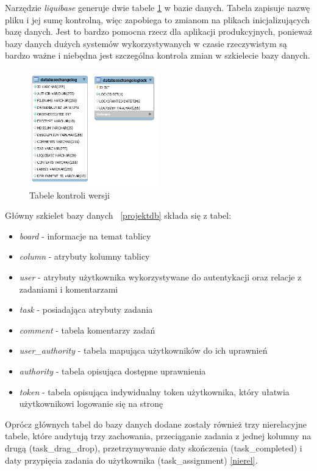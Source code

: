 Narzędzie \textit{liquibase} generuje dwie tabele \ref{liqutable} w bazie danych. Tabela zapisuje nazwę pliku i jej sumę kontrolną, więc zapobiega to zmianom na plikach inicjalizujących bazę danych.
Jest to bardzo pomocna rzecz dla aplikacji produkcyjnych, ponieważ bazy danych dużych systemów wykorzystywanych w czasie rzeczywistym są bardzo ważne i niebędna jest szczególna kontrola zmian w szkielecie bazy danych.
\clearpage
\begin{figure}[h]
	\centering
	\includegraphics[width=0.50\textwidth]{liquibasetables}
	\caption{ Tabele kontroli wersji}
	\label{liqutable}
\end{figure}

Główny szkielet bazy danych  ~\ref{projektdb}
składa się z tabel:
\begin{itemize}
	\item \textit{board} - informacje na temat tablicy
	\item \textit{column} - atrybuty kolumny tablicy
		\item \textit{user} - atrybuty użytkownika wykorzystywane do autentykacji oraz relacje z zadaniami i komentarzami
			\item \textit{task} - posiadająca atrybuty zadania
			\item \textit{comment} - tabela komentarzy zadań
				\item \textit{user\_authority} - tabela mapująca użytkowników do ich uprawnień
				\item \textit{authority} - tabela opisująca dostępne uprawnienia
				\item \textit{token} - tabela opisująca indywidualny token użytkownika, który ułatwia użytkownikowi logowanie się na stronę
\end{itemize}

Oprócz głównych tabel do bazy danych dodane zostały również trzy nierelacyjne tabele, które audytują trzy zachowania, przeciąganie zadania z jednej kolumny na drugą (task\_drag\_drop), przetrzymywanie daty skończenia (task\_completed) i daty przypięcia zadania do użytkownika (task\_assignment) \ref{nierel}.

